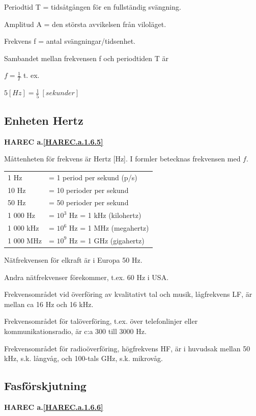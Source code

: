 Periodtid T = tidsåtgången för en fullständig svängning.

Amplitud A = den största avvikelsen från viloläget.

Frekvens f = antal svängningar/tidsenhet.

Sambandet mellan frekvensen f och periodtiden T är

\(f=\frac{1}{T}\) t. ex.

\(5 [H z] = \frac{1}{5}\ [sekunder]\)

\subsection{Enheten Hertz}
\textbf{HAREC a.\ref{HAREC.a.1.6.5}\label{myHAREC.a.1.6.5}}

Måttenheten för frekvens är Hertz [Hz].
I formler betecknas frekvensen med \(f\).

\begin{center}
\begin{tabular}{ll}
1 Hz      & = 1 period per sekund (p/s) \\
10 Hz     & = 10 perioder per sekund \\
50 Hz     & = 50 perioder per sekund \\
1 000 Hz  & = \(10^3\) Hz = 1 kHz (kilohertz) \\
1 000 kHz & = \(10^6\) Hz = 1 MHz (megahertz) \\
1 000 MHz & = \(10^9\) Hz = 1 GHz (gigahertz) \\
\end{tabular}
\end{center}

Nätfrekvensen för elkraft är i Europa 50 Hz.

Andra nätfrekvenser förekommer, t.ex. 60 Hz i USA.

Frekvensområdet vid överföring av kvalitativt tal och musik, lågfrekvens LF, är
mellan ca 16 Hz och 16 kHz.

Frekvensområdet för talöverföring, t.ex. över telefonlinjer eller
kommunikationsradio, är c:a 300 till 3000 Hz.

Frekvensområdet för radioöverföring, högfrekvens HF, är i huvudsak mellan
50 kHz, s.k. långvåg, och 100-tals GHz, s.k. mikrovåg.

\subsection{Fasförskjutning}
\textbf{HAREC a.\ref{HAREC.a.1.6.6}\label{myHAREC.a.1.6.6}}


